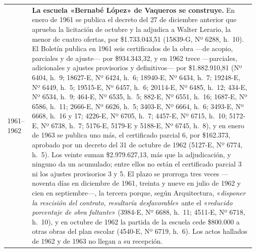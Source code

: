 \begin{longtable}{@{}p{2.7cm}p{10.3cm}@{}}
1961--1962 & \textbf{La escuela «Bernabé López» de Vaqueros se construye.} En enero de 1961 se publica el decreto del 27 de diciembre anterior que aprueba la licitación de octubre y la adjudica a Walter Lerario, la menor de cuatro ofertas, por \$1.733.043,51 (15839-G, Nº 6288, h.\ 10). El Boletín publica en 1961 seis certificados de la obra ---de acopio, parciales y de ajuste--- por \$934.343,32, y en 1962 trece ---parciales, adicionales y ajustes provisorios y definitivos--- por \$1.882.910,81 (Nº 6404, h.\ 9; 18627-E, Nº 6424, h.\ 6; 18940-E, Nº 6434, h.\ 7; 19248-E, Nº 6449, h.\ 5; 19515-E, Nº 6457, h.\ 6; 20114-E, Nº 6485, h.\ 12; 434-E, Nº 6534, h.\ 9; 464-E, Nº 6535, h.\ 5; 882-E, Nº 6551, h.\ 16; 1687-E, Nº 6586, h.\ 11; 2666-E, Nº 6626, h.\ 5; 3403-E, Nº 6664, h.\ 6; 3493-E, Nº 6668, h.\ 16 y 17; 4226-E, Nº 6705, h.\ 7; 4457-E, Nº 6715, h.\ 10; 5172-E, Nº 6738, h.\ 7; 5176-E, 5179-E y 5188-E, Nº 6745, h.\ 8), y en enero de 1963 se publica uno más, el certificado parcial 6, por \$162.373, aprobado por un decreto del 31 de octubre de 1962 (5127-E, Nº 6774, h.\ 5). Los veinte suman \$2.979.627,13, más que la adjudicación, y ninguno da un acumulado; entre ellos no están el certificado parcial 3 ni los ajustes provisorios 3 y 5. El plazo se prorroga tres veces ---noventa días en diciembre de 1961, treinta y nueve en julio de 1962 y cien en septiembre---, la tercera porque, según Arquitectura, «\textit{disponer la rescisión del contrato, resultaría desfavorable}» ante el «\textit{reducido porcentaje de obra faltante}» (3984-E, Nº 6688, h.\ 11; 4511-E, Nº 6718, h.\ 10), y en octubre de 1962 la partida de la escuela cede \$800.000 a otras obras del plan escolar (4540-E, Nº 6719, h.\ 6). Los actos hallados de 1962 y de 1963 no llegan a su recepción. \\

\end{longtable}
